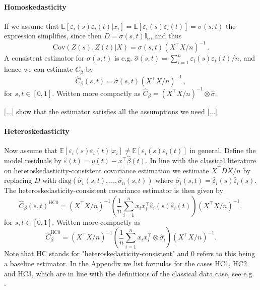 \paragraph{Homoskedasticity}

If we assume that $\mathbb{E}[\varepsilon_i(s) \varepsilon_i(t) | x_i] =
\mathbb{E}[\varepsilon_i(s) \varepsilon_i(t)] = \sigma(s, t)$ the expression simplifies,
since then $D = \sigma(s, t) \mathbb{I}_n$, and thus
\[
    \text{Cov}(Z(s), Z(t) | X) = \sigma(s, t) (X^\top X / n)^{-1} \,.
\]
A consistent estimator for $\sigma(s, t)$ is e.g. $\hat{\sigma}(s, t) = \sum_{i=1}^n
\varepsilon_i(s) \varepsilon_i(t) / n$, and hence we can estimate $C_\beta$ by
\[
    \hat{C}_\beta(s, t) = \hat{\sigma}(s, t) (X^\top X / n)^{-1} \,,
\]
for $s, t \in [0, 1]$. Written more compactly as $\hat{C}_\beta = (X^\top X / n)^{-1}
\otimes \hat{\sigma}$.

\begin{proposition}{}
    [...] show that the estimator satisfies all the assumptions we need [...]
\end{proposition}

\paragraph{Heteroskedasticity}

Now assume that $\mathbb{E}[\varepsilon_i(s) \varepsilon_i(t) | x_i] \neq
\mathbb{E}[\varepsilon_i(s) \varepsilon_i(t)]$ in general. Define the model residuals by
$\hat{\varepsilon}(t) = y(t) - x^\top \hat{\beta}(t)$. In line with the classical
literature on heteroskedasticity-consistent covariance estimation we estimate $X^\top D
X / n$ by replacing $D$ with $\text{diag}(\hat{\sigma}_1(s, t), \dots, \hat{\sigma}_n(s,
t))$ where $\hat{\sigma}_i(s, t) = \hat{\varepsilon}_i(s) \hat{\varepsilon}_i(s)$. The
heteroskedasticity-consistent covariance estimator is then given by
\[
    \hat{C}_\beta(s, t)^{\text{HC0}} = (X^\top X / n)^{-1} ( \frac{1}{n}
    \sum_{i=1}^n x_i x_i^\top \hat{\varepsilon}_i(s) \hat{\varepsilon}_i(t) )
    (X^\top X / n)^{-1},
\]
for $s, t \in [0, 1]$. Written more compactly as
\[
    \hat{C}_\beta^{\text{HC0}} = (X^\top X / n)^{-1} ( \frac{1}{n} \sum_{i=1}^n x_i
    x_i^\top \otimes \hat{\sigma}_i ) (X^\top X / n)^{-1}.
\]
Note that HC stands for "heteroskedasticity-consistent" and 0 refers to this being a
baseline estimator. In the Appendix we list formulas for the cases HC1, HC2 and HC3,
which are in line with the definitions of the classical data case, see e.g.
\cite{hansen_econometrics_book}.

